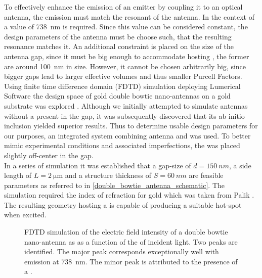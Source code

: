 		To effectively enhance the emission of an emitter by coupling it to an optical antenna, the emission \wl must match the resonant \wl of the antenna. In the context of \sivs a value of \SI{738}{nm} is required. Since this value can be considered constant, the design parameters of the antenna must be choose such, that the resulting resonance matches it. An additional constraint is placed on the size of the antenna gap, since it must be big enough to accommodate \nds hosting \sivs, the former are around \SI{100}{\nm} in size. However, it cannot be chosen arbitrarily big, since bigger gaps lead to larger effective volumes and thus smaller Purcell Factors.
		\\
		Using finite time difference domain (FDTD) simulation deploying Lumerical Software the design space of gold double bowtie nano-antennas on a gold substrate was explored \cite{rahbany2016towards}. Although we initially attempted to simulate antennas without a \nd present in the gap, it was subsequently discovered that its ab initio inclusion yielded superior results. Thus to determine usable design parameters for our purposes, an integrated system combining antenna and \nd was used. To better mimic experimental conditions and associated imperfections, the \nd was placed slightly off-center in the gap.
		\\
		In a series of simulation it was established that a gap-size of $d = \SI{150}{nm}$, a side length of $L = \SI{2}{\micro\meter}$ and a structure thickness of $S = \SI{60}{nm}$ are feasible parameters as referred to in \autoref{double_bowtie_antenna_schematic}. The simulation required the index of refraction for gold which was taken from Palik \cite{Palik, E. D. Handbook of optical constants of solids. 3, (Academic press, 1998)}.
		\\
		The resulting geometry hosting a \nd is capable of producing a suitable hot-spot when excited.

		\begin{figure}[htp]
				\centering
			\caption[Simulation of the resonance spectrum of a double bowtie antenna]{FDTD simulation of the electric field intensity of a double bowtie nano-antenna as as a function of the \wl of incident light. Two peaks are identified. The major peak corresponds exceptionally well with \siv emission at \SI{738}{nm}. The minor peak is attributed to the presence of a \nd.}
			\label{fig::antenna_fdtd_spectrum}
		\end{figure}

